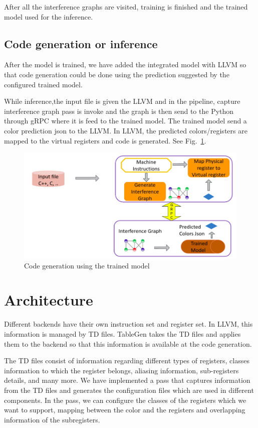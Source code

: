 After all the interference graphs are visited, training is finished and the trained model used for the inference.
\subsection{Code generation or inference}
After the model is trained, we have added the integrated model with LLVM so that code generation could be done using the prediction suggested by the configured trained model.

While inference,the input file is given the LLVM and in the pipeline,  capture interference graph pass is invoke and the graph is then send to the Python through gRPC where it is feed to the trained model. The trained model send a color prediction json to the LLVM. In LLVM, the predicted colors/registers are mapped to the virtual registers and code is generated. See Fig.~\ref{fig:mlra-inference}.
\begin{figure}[t]
    \centering
    \includegraphics[scale=0.4]{figures/chapter-5/mlra_inference.png}
    \caption{Code generation using the trained model}
     \label{fig:mlra-inference}
\end{figure}


\section{Architecture}\label{sec:mlra:arch}
Different backends have their own instruction set and register set. In LLVM, this information is managed by TD files. TableGen takes the TD files and applies them to the backend so that this information is available at the code generation.

The TD files consist of information regarding different types of registers, classes information to which the register belongs, aliasing information, sub-registers details, and many more.
We have implemented a pass that captures information from the TD files and generates the configuration files which are used in different components. In the pass, we can configure the classes of the registers which we want to support, mapping between the color and the registers and overlapping information of the subregisters. 

